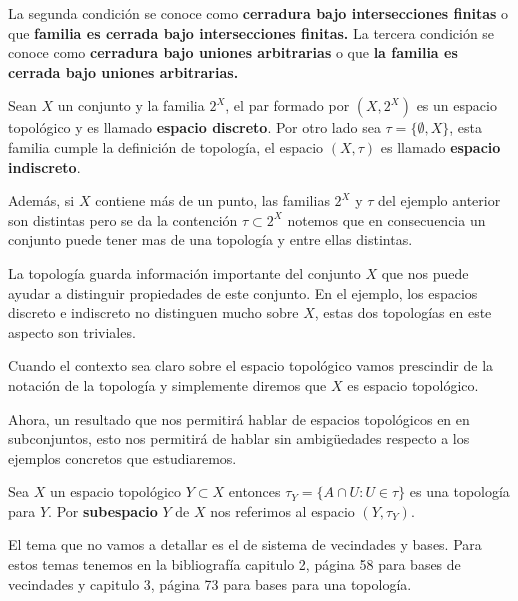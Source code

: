 \begin{nt}
La segunda condición se conoce como \textbf{cerradura bajo intersecciones finitas} o que \textbf{familia es cerrada bajo intersecciones finitas.} La tercera condición se conoce como \textbf{cerradura bajo uniones arbitrarias} o que \textbf{la familia es cerrada bajo uniones arbitrarias.}
\end{nt}

\begin{ej}
Sean $X$ un conjunto y la familia $2^X$, el par formado por $(X, 2^X)$ es un espacio topológico y es llamado \textbf{espacio discreto}. Por otro lado sea $\tau=\{\emptyset, X\}$, esta familia cumple la definición de topología, el espacio $(X, \tau)$ es llamado \textbf{espacio indiscreto}.
\end{ej}

Además, si $X$ contiene más de un punto, las familias $2^X$ y $\tau$ del ejemplo anterior son distintas pero se da la contención  $\tau \subset 2^X$ notemos que en consecuencia un conjunto puede tener mas de una topología y entre ellas distintas. 

La topología guarda información importante del conjunto $X$ que nos puede ayudar a distinguir propiedades de este conjunto. En el ejemplo, los espacios discreto e indiscreto no distinguen mucho sobre $X$, estas dos topologías en este aspecto son triviales.

\begin{cn}
Cuando el contexto sea claro sobre el espacio topológico vamos prescindir de la notación de la topología y simplemente diremos que $X$ es espacio topológico. 
\end{cn}

Ahora, un resultado que nos permitirá hablar de espacios topológicos en en subconjuntos, esto nos permitirá de hablar sin ambigüedades respecto a los ejemplos concretos que estudiaremos. 

\begin{te}
Sea $X$ un espacio topológico $Y \subset X$ entonces $\tau_Y =\{A \cap U: U \in \tau\}$ es una topología para $Y$. Por \textbf{subespacio} $Y$ de $X$ nos referimos al espacio $(Y, \tau_Y)$.
\end{te}

\begin{cn}
El tema que no vamos a detallar es el de sistema de vecindades y bases. Para estos temas tenemos en la bibliografía \cite{top_prieto} capitulo 2, página 58 para bases de vecindades y capitulo 3, página 73 para bases para una topología.
\end{cn}


